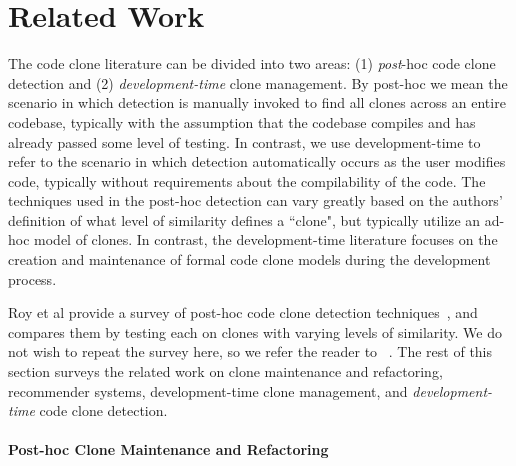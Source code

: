 \documentclass[nocopyrightspace,10pt]{sigplanconf}
\begin{document}

\section{Related Work}
\label{sec:related}

The code clone literature can be divided into two areas: (1)
\emph{post}-hoc code clone detection and
(2) \emph{development-time} clone management. By post-hoc we mean the scenario in which
detection is manually invoked to find all clones across an entire codebase, typically with the assumption that the codebase compiles and has already passed some level of testing.  In contrast, we use development-time to refer to the scenario in which detection automatically occurs as the user modifies code, typically without requirements about the compilability of the code.  The techniques used in the
post-hoc detection can vary greatly  based on the authors' definition of what 
level of similarity defines a ``clone", but typically utilize an
ad-hoc model of clones. In contrast, the development-time literature focuses on
the creation and maintenance of formal code clone models during the
development process.

Roy et al provide a survey of post-hoc code clone detection
techniques~\cite{Roy2009}, and compares them by testing 
each on clones with varying levels of similarity. We do not wish 
to repeat the survey here, so we refer the reader to ~\cite{Roy2009}.
The rest of this section surveys the
related work on clone maintenance and refactoring, recommender systems,
development-time clone management, and \emph{development-time} code clone detection.

\paragraph{Post-hoc Clone Maintenance and Refactoring}

\end{document}
